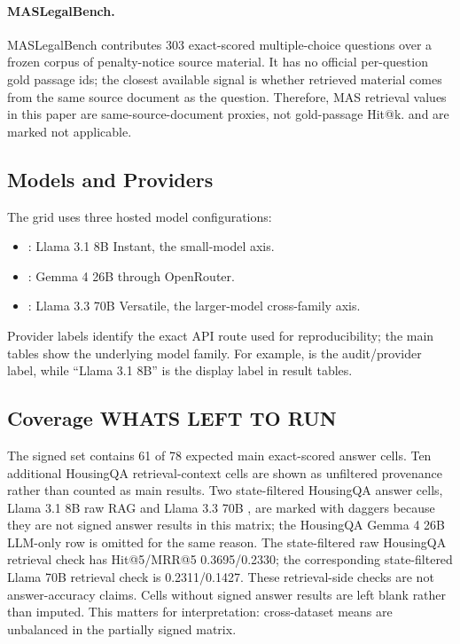 \paragraph{MASLegalBench.}

MASLegalBench contributes 303 exact-scored multiple-choice questions over a
frozen corpus of penalty-notice source material. It has no official
per-question gold passage ids; the closest available signal is whether
retrieved material comes from the same source document as the question.
Therefore, MAS retrieval values in this paper
are same-source-document proxies, not gold-passage Hit@k.
 and  are marked not
applicable.

\subsection{Models and Providers}
The grid uses three hosted model configurations:

\begin{itemize}[leftmargin=*]
\item {}: Llama 3.1 8B Instant, the small-model axis.
\item {}: Gemma 4 26B through OpenRouter.
\item {}: Llama 3.3 70B Versatile, the larger-model
cross-family axis.
\end{itemize}

Provider labels identify the exact API route used for reproducibility; the main
tables show the underlying model family. For example,
 is the audit/provider label, while ``Llama 3.1 8B'' is
the display label in result tables.

\subsection{Coverage WHATS LEFT TO RUN}



The signed set contains 61 of 78 expected main exact-scored answer cells. Ten
additional HousingQA retrieval-context cells are shown as unfiltered provenance
rather than counted as main results. Two state-filtered HousingQA answer cells,
Llama 3.1 8B raw RAG and Llama 3.3 70B \hyre{}, are marked with daggers because
they are not signed answer results in this matrix; the HousingQA Gemma 4 26B
LLM-only row is omitted for the same reason. The state-filtered raw HousingQA
retrieval check has Hit@5/MRR@5 0.3695/0.2330; the corresponding
state-filtered Llama 70B \hyre{} retrieval check is 0.2311/0.1427. These
retrieval-side checks are not answer-accuracy claims. Cells without signed
answer results are left blank rather than imputed. This matters for
interpretation: cross-dataset means are unbalanced in the partially signed
matrix.


